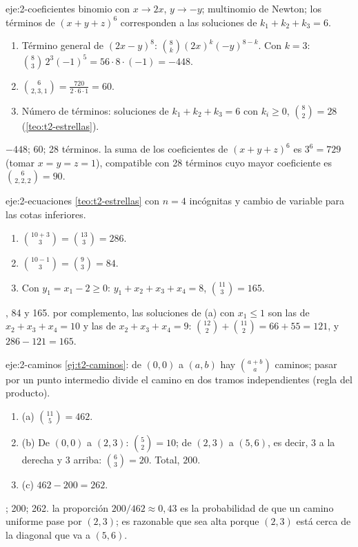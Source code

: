 \begin{solucion}{eje:2-coeficientes}
\planteamiento binomio con $x\to2x$, $y\to-y$; multinomio de Newton; los términos de $(x+y+z)^{6}$ corresponden a las soluciones de $k_1+k_2+k_3=6$.
\pasos
\begin{enumerate}[label=\arabic*.]
  \item Término general de $(2x-y)^{8}$: $\binom8k(2x)^{k}(-y)^{8-k}$. Con $k=3$: $\binom83\,2^{3}(-1)^{5}=56\cdot8\cdot(-1)=-448$.
  \item $\binom{6}{2,3,1}=\frac{720}{2\cdot6\cdot1}=60$.
  \item Número de términos: soluciones de $k_1+k_2+k_3=6$ con $k_i\ge0$, $\binom{8}{2}=28$ (\cref{teo:t2-estrellas}).
\end{enumerate}
\resultado $-448$; $60$; 28 términos.
\comprobacion la suma de los coeficientes de $(x+y+z)^{6}$ es $3^{6}=729$ (tomar $x=y=z=1$), compatible con 28 términos cuyo mayor coeficiente es $\binom{6}{2,2,2}=90$.
\end{solucion}

\begin{solucion}{eje:2-ecuaciones}
\planteamiento \cref{teo:t2-estrellas} con $n=4$ incógnitas y cambio de variable para las cotas inferiores.
\pasos
\begin{enumerate}[label=(\alph*)]
  \item $\binom{10+3}{3}=\binom{13}3=286$.
  \item $\binom{10-1}{3}=\binom93=84$.
  \item Con $y_1=x_1-2\ge0$: $y_1+x_2+x_3+x_4=8$, $\binom{11}{3}=165$.
\end{enumerate}
, 84 y 165.
\comprobacion por complemento, las soluciones de (a) con $x_1\le1$ son las de $x_2+x_3+x_4=10$ y las de $x_2+x_3+x_4=9$: $\binom{12}2+\binom{11}2=66+55=121$, y $286-121=165$.
\end{solucion}

\begin{solucion}{eje:2-caminos}
\planteamiento \cref{ej:t2-caminos}: de $(0,0)$ a $(a,b)$ hay $\binom{a+b}{a}$ caminos; pasar por un punto intermedio divide el camino en dos tramos independientes (regla del producto).
\pasos
\begin{enumerate}[label=\arabic*.]
  \item (a) $\binom{11}{5}=462$.
  \item (b) De $(0,0)$ a $(2,3)$: $\binom52=10$; de $(2,3)$ a $(5,6)$, es decir, 3 a la derecha y 3 arriba: $\binom63=20$. Total, $200$.
  \item (c) $462-200=262$.
\end{enumerate}
; 200; 262.
\comprobacion la proporción $200/462\approx0{,}43$ es la probabilidad de que un camino uniforme pase por $(2,3)$; es razonable que sea alta porque $(2,3)$ está cerca de la diagonal que va a $(5,6)$.
\end{solucion}

